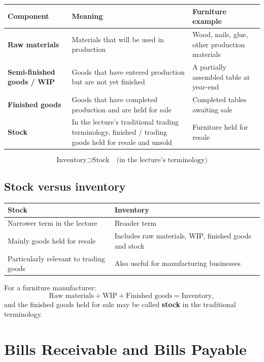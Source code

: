 \documentclass[11pt,a4paper]{article}
\begin{document}
\begin{center}
\small
\begin{tabularx}{\textwidth}{@{}l Y Y@{}}
\toprule
{}\textbf{Component} & \textbf{Meaning} & \textbf{Furniture example}\\
\midrule
\textbf{Raw materials} & Materials that will be used in production & Wood, nails, glue, other production materials\\
\textbf{Semi-finished goods / WIP} & Goods that have entered production but are not yet finished & A partially assembled table at year-end\\
\textbf{Finished goods} & Goods that have completed production and are held for sale & Completed tables awaiting sale\\
\textbf{Stock} & In the lecture's traditional trading terminology, finished / trading goods held for resale and unsold & Furniture held for resale\\
\bottomrule
\end{tabularx}
\end{center}

\[
\boxed{\text{Inventory}\supset\text{Stock}}\quad\text{(in the lecture's terminology)}
\]

\subsection{Stock versus inventory}

\begin{center}
\small
\begin{tabularx}{\textwidth}{@{}Y Y@{}}
\toprule
{}\textbf{Stock} & \textbf{Inventory}\\
\midrule
Narrower term in the lecture & Broader term\\
Mainly goods held for resale & Includes raw materials, WIP, finished goods and stock\\
Particularly relevant to trading goods & Also useful for manufacturing businesses\\
\bottomrule
\end{tabularx}
\end{center}

For a furniture manufacturer:
\[
\text{Raw materials}+\text{WIP}+\text{Finished goods}=\text{Inventory},
\]
and the finished goods held for sale may be called \textbf{stock} in the traditional terminology.

\section{Bills Receivable and Bills Payable}
\end{document}
